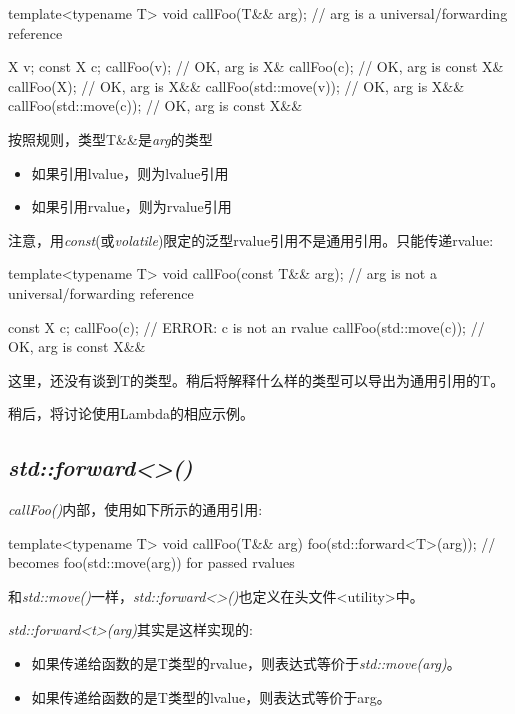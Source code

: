 \begin{cppcode}
template<typename T>
void callFoo(T&& arg); // arg is a universal/forwarding reference

X v;
const X c;
callFoo(v); // OK, arg is X&
callFoo(c); // OK, arg is const X&
callFoo(X{}); // OK, arg is X&&
callFoo(std::move(v)); // OK, arg is X&&
callFoo(std::move(c)); // OK, arg is const X&&
\end{cppcode}

按照规则，类型T\&\&是\textit{arg}的类型

\begin{itemize}
	\item 如果引用lvalue，则为lvalue引用
	\item 如果引用rvalue，则为rvalue引用
\end{itemize}

注意，用\textit{const}(或\textit{volatile})限定的泛型rvalue引用不是通用引用。只能传递rvalue:

\begin{cppcode}
template<typename T>
void callFoo(const T&& arg); // arg is not a universal/forwarding reference

const X c;
callFoo(c); // ERROR: c is not an rvalue
callFoo(std::move(c)); // OK, arg is const X&&
\end{cppcode}

这里，还没有谈到T的类型。稍后将解释什么样的类型可以导出为通用引用的T。

稍后，将讨论使用Lambda的相应示例。

\subsection{\textit{std::forward<>()}}

\textit{callFoo()}内部，使用如下所示的通用引用:

\begin{cppcode}
template<typename T>
void callFoo(T&& arg) {
	foo(std::forward<T>(arg)); // becomes foo(std::move(arg)) for passed rvalues
}
\end{cppcode}

和\textit{std::move()}一样，\textit{std::forward<>()}也定义在头文件<utility>中。

\textit{std::forward<t>(arg)}其实是这样实现的:

\begin{itemize}
	\item 如果传递给函数的是T类型的rvalue，则表达式等价于\textit{std::move(arg)}。
	\item 如果传递给函数的是T类型的lvalue，则表达式等价于arg。
\end{itemize}

